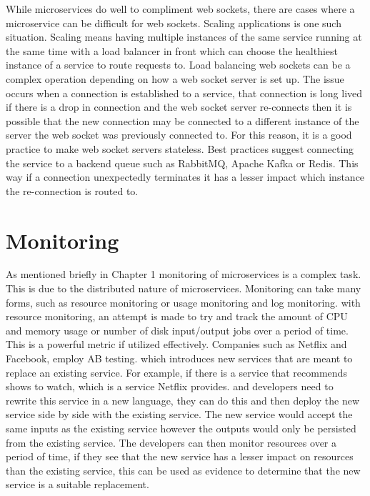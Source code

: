 While microservices do well to compliment web sockets, there are cases where a microservice can be difficult for web sockets. Scaling applications is one such situation. Scaling means having multiple instances of the same service running at the same time with a load balancer in front which can choose the healthiest instance of a service to route requests to. Load balancing web sockets can be a complex operation depending on how a web socket server is set up. The issue occurs when a connection is established to a service, that connection is long lived if there is a drop in connection and the web socket server re-connects then it is possible that the new connection may be connected to a different instance of the server the web socket was previously connected to. For this reason, it is a good practice to make web socket servers stateless. Best practices suggest connecting the service to a backend queue such as RabbitMQ, Apache Kafka or Redis. This way if a connection unexpectedly terminates it has a lesser impact which instance the re-connection is routed to.

\section{Monitoring}

As mentioned briefly in Chapter 1 monitoring of microservices is a complex task. This is due to the distributed nature of microservices. Monitoring can take many forms, such as resource monitoring or usage monitoring and log monitoring. with resource monitoring, an attempt is made to try and track the amount of CPU and memory usage or number of disk input/output jobs over a period of time. This is a powerful metric if utilized effectively. Companies such as Netflix and Facebook, employ AB testing. which introduces new services that are meant to replace an existing service. For example, if there is a service that recommends shows to watch, which is a service Netflix provides. and developers need to rewrite this service in a new language, they can do this and then deploy the new service side by side with the existing service. The new service would accept the same inputs as the existing service however the outputs would only be persisted from the existing service. The developers can then monitor resources over a period of time, if they see that the new service has a lesser impact on resources than the existing service, this can be used as evidence to determine that the new service is a suitable replacement.


